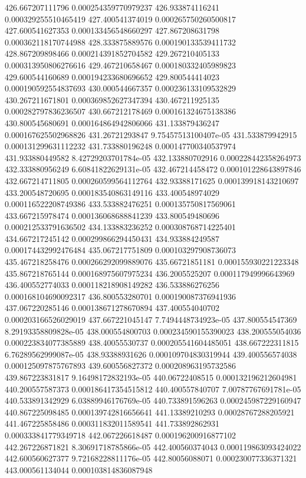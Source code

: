 {426.667207111796 0.000254359770979237
426.933874116241 0.000329255510465419
427.400541374019 0.000265750260500817
427.600541627353 0.000133456548660297
427.867208631798 0.000362118170744988
428.333875889576 0.000190133539411732
428.867209898466 0.000214391852704582
429.267210405133 0.000313950806276616
429.467210658467 0.000180332405989823
429.600544160689 0.000194233680696652
429.800544414023 0.000190592554837693
430.000544667357 0.000236133109532829
430.267211671801 0.000369852627347394
430.467211925135 0.000282797836236507
430.667212178469 0.000161324675138386
430.800545680691 0.000164864942806066
431.133879436247 0.000167625502968826
431.26721293847 9.75457513100407e-05
431.533879942915 0.000131299631112232
431.733880196248 0.000147700340537974
431.933880449582 8.42729203701784e-05
432.133880702916 0.000228442358264973
432.333880956249 6.60841822629131e-05
432.467214458472 0.000101228643897846
432.667214711805 0.000260599564112764
432.93388171625 0.000139918143210697
433.200548720695 0.000183540863149116
433.400548974029 0.000116522208749386
433.533882476251 0.000135750817569061
433.667215978474 0.000136068688841239
433.800549480696 0.000212533791636502
434.133883236252 0.000308768714225401
434.667217245142 0.000299866294450431
434.933884249587 0.000174432992476484
435.067217751809 0.000103297908736073
435.467218258476 0.000266292099889076
435.66721851181 0.000155930221223348
435.867218765144 0.000168975607975234
436.2005525207 0.000117949996643969
436.400552774033 0.000118218908149282
436.533886276256 0.000168104690092317
436.800553280701 0.000190087376941936
437.067220285146 0.000138671278670894
437.400554040702 0.000203166526029019
437.667221045147 7.7494448734923e-05
437.800554547369 8.29193358809828e-05
438.000554800703 0.000234590155390023
438.200555054036 0.000223834077385889
438.40055530737 0.000205541604485051
438.667222311815 6.76289562999087e-05
438.93388931626 0.000109704830319944
439.400556574038 0.000125097875767893
439.600556827372 0.000208963195732586
439.867223831817 9.16498172832193e-05
440.06722408515 0.000132196212604981
440.200557587373 0.000186417354515812
440.400557840707 7.00787767691781e-05
440.533891342929 6.03889946176769e-05
440.733891596263 0.000245987229160947
440.867225098485 0.000139742816656641
441.13389210293 0.00028767288205921
441.467225858486 0.000311832011589541
441.733892862931 0.000333841779349718
442.067226618487 0.000196200916877102
442.267226871821 8.30691718785866e-05
442.400560374043 0.000119863093424022
442.600560627377 9.72168228811176e-05
442.80056088071 0.000230077336371321
443.000561134044 0.000103814836087948
}
